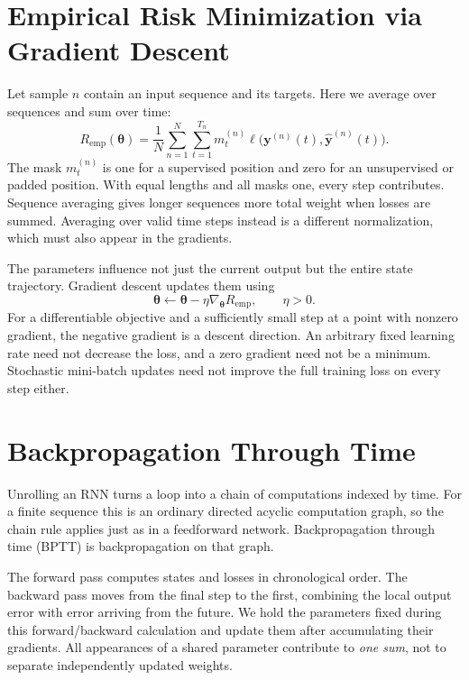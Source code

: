 \documentclass[11pt, oneside]{book}
\newcommand{\params}{\boldsymbol{\theta}}   %
\let\originalsection\section
\renewcommand{\section}{\Needspace{7\baselineskip}\originalsection}
\begin{document}
\section{Empirical Risk Minimization via Gradient Descent}\label{sec:source-2-1}
Let sample $n$ contain an input sequence and its targets. Here we average over sequences and sum over time:
\begin{equation}
 R_{\mathrm{emp}}(\params)=\frac1N\sum_{n=1}^N\sum_{t=1}^{T_n}
 m_t^{(n)}\ell\bigl(\mathbf{y}^{(n)}(t),\widehat{\mathbf{y}}^{(n)}(t)\bigr).
 \label{eq:sequence-risk}
\end{equation}
The mask $m_t^{(n)}$ is one for a supervised position and zero for an unsupervised or padded position. With equal lengths and all masks one, every step contributes. Sequence averaging gives longer sequences more total weight when losses are summed. Averaging over valid time steps instead is a different normalization, which must also appear in the gradients.

The parameters influence not just the current output but the entire state trajectory. Gradient descent updates them using
\[
 \params\leftarrow\params-\eta\nabla_{\params}R_{\mathrm{emp}},\qquad \eta>0.
\]
For a differentiable objective and a sufficiently small step at a point with nonzero gradient, the negative gradient is a descent direction. An arbitrary fixed learning rate need not decrease the loss, and a zero gradient need not be a minimum. Stochastic mini-batch updates need not improve the full training loss on every step either.

\section{Backpropagation Through Time}\label{sec:source-2-2}
Unrolling an RNN turns a loop into a chain of computations indexed by time. For a finite sequence this is an ordinary directed acyclic computation graph, so the chain rule applies just as in a feedforward network. Backpropagation through time (BPTT) is backpropagation on that graph.

The forward pass computes states and losses in chronological order. The backward pass moves from the final step to the first, combining the local output error with error arriving from the future. We hold the parameters fixed during this forward/backward calculation and update them after accumulating their gradients. All appearances of a shared parameter contribute to \emph{one sum}, not to separate independently updated weights.
\end{document}
